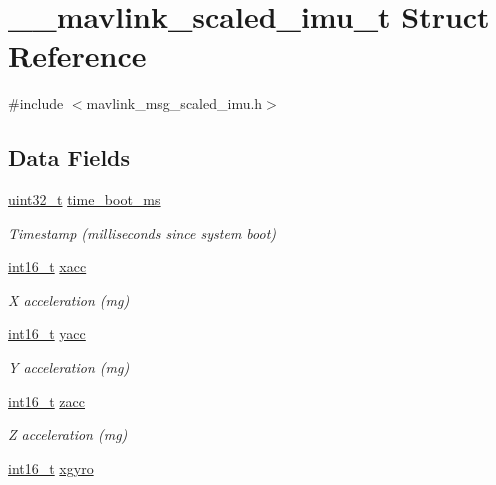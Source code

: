 \hypertarget{struct____mavlink__scaled__imu__t}{\section{\-\_\-\-\_\-mavlink\-\_\-scaled\-\_\-imu\-\_\-t Struct Reference}
\label{struct____mavlink__scaled__imu__t}
}


{\ttfamily \#include $<$mavlink\-\_\-msg\-\_\-scaled\-\_\-imu.\-h$>$}

\subsection*{Data Fields}
\begin{DoxyCompactItemize}
\item 
\hyperlink{stdint_8h_a435d1572bf3f880d55459d9805097f62}{uint32\-\_\-t} \hyperlink{struct____mavlink__scaled__imu__t_a3bdcf7dc969ea7ca67657b1420652468}{time\-\_\-boot\-\_\-ms}
\begin{DoxyCompactList}\small\item\em Timestamp (milliseconds since system boot) \end{DoxyCompactList}\item 
\hyperlink{stdint_8h_aa343fa3b3d06292b959ffdd4c4703b06}{int16\-\_\-t} \hyperlink{struct____mavlink__scaled__imu__t_a2fe0911cd27268449b437b15d5bc8ab7}{xacc}
\begin{DoxyCompactList}\small\item\em X acceleration (mg) \end{DoxyCompactList}\item 
\hyperlink{stdint_8h_aa343fa3b3d06292b959ffdd4c4703b06}{int16\-\_\-t} \hyperlink{struct____mavlink__scaled__imu__t_aa3c8baf85a0087a26c7be8d2203744f8}{yacc}
\begin{DoxyCompactList}\small\item\em Y acceleration (mg) \end{DoxyCompactList}\item 
\hyperlink{stdint_8h_aa343fa3b3d06292b959ffdd4c4703b06}{int16\-\_\-t} \hyperlink{struct____mavlink__scaled__imu__t_aa7263339399089b12c2874278033a5a1}{zacc}
\begin{DoxyCompactList}\small\item\em Z acceleration (mg) \end{DoxyCompactList}\item 
\hyperlink{stdint_8h_aa343fa3b3d06292b959ffdd4c4703b06}{int16\-\_\-t} \hyperlink{struct____mavlink__scaled__imu__t_aed9c79287653e608e2eef8b904189fae}{xgyro}

\end{DoxyCompactItemize}
